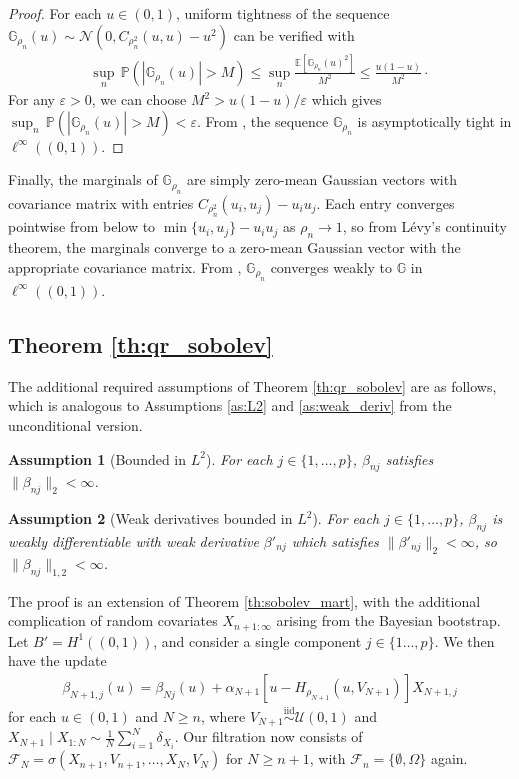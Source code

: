 \documentclass[11pt,a4paper]{article}
\newtheorem{as}{Assumption}
\newcommand{\iid}{\overset{\mathrm{iid}}{\sim}}
\newcommand{\E}{\mathbb{E}}
\renewcommand{\Pr}{\mathbb{P}}
\begin{document}
\begin{appendices}
\begin{proof}
For each $u\in(0,1)$, uniform tightness of the sequence $\mathbb{G}_{\rho_n}(u) \sim \mathcal{N}(0,C_{\rho_n^2}(u,u) - u^2)$  can be verified with
\begin{align*}
    \sup_n \, \Pr\left(|\mathbb{G}_{\rho_n}(u)| > M \right) \leq \sup_n\frac{\E\left[\mathbb{G}_{\rho_n}(u)^2\right]}{M^2} \leq \frac{u(1-u)}{M^2}\cdot
\end{align*}
For any $\varepsilon > 0$, we can choose $M^2 > u(1-u)/\varepsilon$ which gives $ \sup_n \, \Pr\left(|\mathbb{G}_{\rho_n}(u)| > M \right) < \varepsilon$. From \citet[Theorem 1.5.7]{vanderVaart2023}, the sequence $\mathbb{G}_{\rho_n}$ is asymptotically tight in $\ell^\infty((0,1))$. 
\end{proof}
Finally, the marginals  of $\mathbb{G}_{\rho_n}$ are simply zero-mean Gaussian vectors with covariance matrix with entries $C_{\rho_n^2}(u_i,u_j) - u_i u_j$. Each entry converges pointwise from below to $\min\{u_i,u_j \} - u_i u_j$ as $\rho_n \to 1$, so from Lévy's continuity theorem, the marginals converge to a zero-mean Gaussian vector with the appropriate covariance matrix. From \citet[Theorem 1.5.4]{vanderVaart2023}, $\mathbb{G}_{\rho_n}$ converges weakly to $\mathbb{G}$ in $\ell^\infty((0,1))$.
    
\subsection{Theorem \ref{th:qr_sobolev}}
The additional required assumptions of {Theorem \ref{th:qr_sobolev}} are as follows, which is analogous to {Assumptions \ref{as:L2}} and {\ref{as:weak_deriv}} from the unconditional version.
\begin{as}[Bounded in $L^2$]\label{as:beta_L2}
    For each $j \in \{1,\ldots,p\}$, $\beta_{nj}$ satisfies $\|\beta_{nj}\|_2 < \infty$.
\end{as}
\begin{as}[Weak derivatives bounded in $L^2$]\label{as:beta_weak_deriv} 
    For each $j \in \{1,\ldots,p\}$, $\beta_{nj}$ is weakly differentiable with weak derivative $\beta'_{nj}$ which satisfies $\|\beta'_{nj}\|_2 < \infty$, so $\|\beta_{nj}\|_{1,2} <\infty$.
\end{as}
The proof is an extension of {Theorem \ref{th:sobolev_mart}}, with the additional complication of random covariates $X_{n+1:\infty}$ arising from the Bayesian bootstrap. Let $B' = H^1((0,1))$, and consider a single component $j  \in \{1\ldots,p\}$. We then have the update
\begin{align*}
    \beta_{N+1,j}(u) = \beta_{Nj}(u) + \alpha_{N+1}\left[u - H_{\rho_{N+1}}(u,V_{N+1})\right] X_{N+1,j}
\end{align*}
for each $u \in (0,1)$  and $N \geq n$, where $V_{N+1} \iid \mathcal{U}(0,1)$ and $X_{N+1}\mid X_{1:N} \sim \frac{1}{N}\sum_{i = 1}^{N}\delta_{X_i}$. Our filtration now consists of $\mathcal{F}_N = \sigma\left(X_{n+1}, V_{n+1}, \ldots, X_N, V_N\right)$
 for $N \geq n+1$, with $\mathcal{F}_{n} = \{\emptyset, \Omega\}$ again.


\end{appendices}
\end{document}
